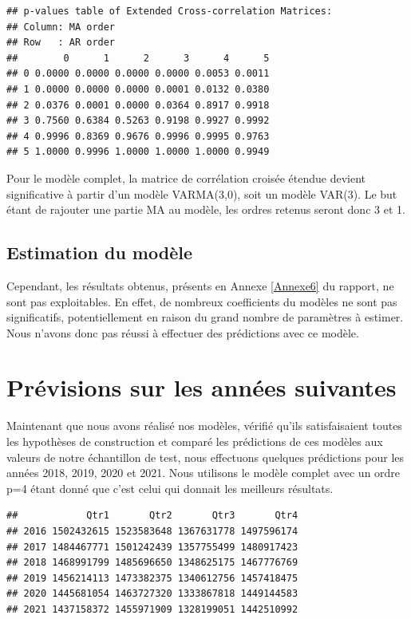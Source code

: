 \documentclass[11pt,]{article}
\begin{document}
\begin{verbatim}
## p-values table of Extended Cross-correlation Matrices: 
## Column: MA order 
## Row   : AR order 
##        0      1      2      3      4      5
## 0 0.0000 0.0000 0.0000 0.0000 0.0053 0.0011
## 1 0.0000 0.0000 0.0000 0.0001 0.0132 0.0380
## 2 0.0376 0.0001 0.0000 0.0364 0.8917 0.9918
## 3 0.7560 0.6384 0.5263 0.9198 0.9927 0.9992
## 4 0.9996 0.8369 0.9676 0.9996 0.9995 0.9763
## 5 1.0000 0.9996 1.0000 1.0000 1.0000 0.9949
\end{verbatim}

Pour le modèle complet, la matrice de corrélation croisée étendue
devient significative à partir d'un modèle VARMA(3,0), soit un modèle
VAR(3). Le but étant de rajouter une partie MA au modèle, les ordres
retenus seront donc 3 et 1.

\subsection{Estimation du modèle}\label{estimation-du-modele-1}

Cependant, les résultats obtenus, présents en Annexe \ref{Annexe6} du
rapport, ne sont pas exploitables. En effet, de nombreux coefficients du
modèles ne sont pas significatifs, potentiellement en raison du grand
nombre de paramètres à estimer. Nous n'avons donc pas réussi à effectuer
des prédictions avec ce modèle.

\newpage

\section{Prévisions sur les années
suivantes}\label{previsions-sur-les-annees-suivantes}

Maintenant que nous avons réalisé nos modèles, vérifié qu'ils
satisfaisaient toutes les hypothèses de construction et comparé les
prédictions de ces modèles aux valeurs de notre échantillon de test,
nous effectuons quelques prédictions pour les années 2018, 2019, 2020 et
2021. Nous utilisons le modèle complet avec un ordre p=4 étant donné que
c'est celui qui donnait les meilleurs résultats.

\begin{verbatim}
##            Qtr1       Qtr2       Qtr3       Qtr4
## 2016 1502432615 1523583648 1367631778 1497596174
## 2017 1484467771 1501242439 1357755499 1480917423
## 2018 1468991799 1485696650 1348625175 1467776769
## 2019 1456214113 1473382375 1340612756 1457418475
## 2020 1445681054 1463727320 1333867818 1449144583
## 2021 1437158372 1455971909 1328199051 1442510992
\end{verbatim}
\end{document}
